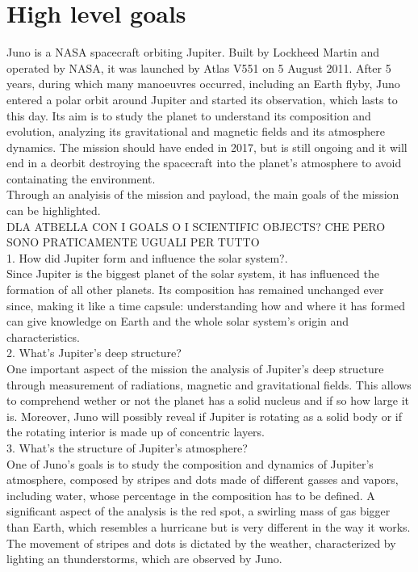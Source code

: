\section{High level goals}
\label{sec:goals}
Juno is a NASA spacecraft orbiting Jupiter. Built by Lockheed Martin and operated by NASA, it was launched by Atlas V551 on 5 August 2011. After 5 years, during which many manoeuvres occurred, including an Earth flyby, Juno entered a polar orbit around Jupiter and started its observation, which lasts to this day. Its aim is to study the planet to understand its composition and evolution, analyzing its gravitational and magnetic fields and its atmosphere dynamics. The mission should have ended in 2017, but is still ongoing and it will end in a deorbit destroying the spacecraft into the planet's atmosphere to avoid containating the environment. 
\\   

Through an analyisis of the mission and payload, the main goals of the mission can be highlighted. \\


DLA ATBELLA CON I GOALS O I SCIENTIFIC OBJECTS? CHE PERO SONO PRATICAMENTE UGUALI PER TUTTO \\

1. How did Jupiter form and influence the solar system?. \\
Since Jupiter is the biggest planet of the solar system, it has influenced the formation of all other planets. Its composition has remained unchanged ever since, making it like a time capsule: understanding how and where it has formed can give knowledge on Earth and the whole solar system’s origin and characteristics. \\




2. What's Jupiter's deep structure?\\
One important aspect of the mission the analysis of Jupiter's deep structure through measurement of radiations, magnetic and gravitational fields. This allows to comprehend wether or not the planet has a solid nucleus and if so how large it is. Moreover, Juno will possibly reveal if Jupiter is rotating as a solid body or if the rotating interior is made up of concentric layers.\\

3. What's the structure of Jupiter's atmosphere?\\
One of Juno's goals is to study the composition and dynamics of Jupiter's atmosphere, composed by stripes and dots made of different gasses and vapors, including water, whose percentage in the composition has to be defined. A significant aspect of the analysis is the red spot, a swirling mass of gas bigger than Earth, which resembles a hurricane but is very different in the way it works. The movement of stripes and dots is dictated by the weather, characterized by lighting an thunderstorms, which are observed by Juno. \\

